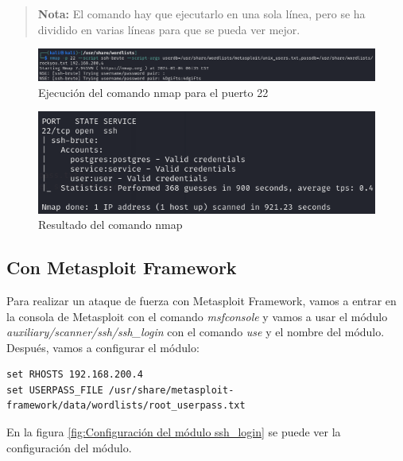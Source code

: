 \documentclass[11pt]{report}
\begin{document}
\begin{quote}
  \textbf{Nota:} El comando hay que ejecutarlo en una sola línea, pero se ha dividido en varias líneas para que se pueda ver mejor.
\end{quote}

\begin{figure}[H]
  \centering
  \includegraphics[scale=0.63]{img/nmap_ssh.png}
  \caption{Ejecución del comando nmap para el puerto 22}
\end{figure}

\begin{figure}[H]
  \centering
  \includegraphics[scale=0.7]{img/nmap_ssh_result.png}
  \caption{Resultado del comando nmap}
\end{figure}

\subsection{Con Metasploit Framework}
Para realizar un ataque de fuerza con Metasploit Framework, vamos a entrar en la consola de Metasploit con el comando \emph{msfconsole} y vamos a usar el módulo \emph{auxiliary/scanner/ssh/ssh\_login} con el comando \emph{use} y el nombre del módulo.
Después, vamos a configurar el módulo:
\begin{verbatim}
set RHOSTS 192.168.200.4
set USERPASS_FILE /usr/share/metasploit-framework/data/wordlists/root_userpass.txt
\end{verbatim}

En la figura \ref{fig:Configuración del módulo ssh_login} se puede ver la configuración del módulo.
\end{document}

